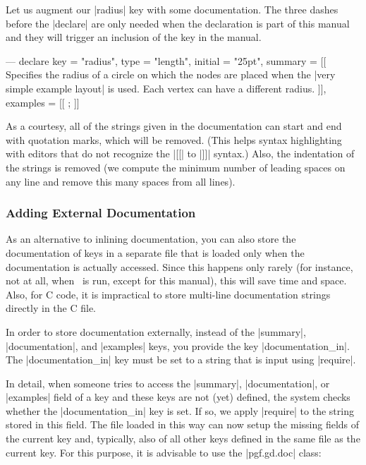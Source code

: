 Let us augment our |radius| key with some documentation. The three
dashes before the |declare| are only needed when the declaration is
part of this manual and they will trigger an inclusion of the key in
the manual.

\begin{codeexample}[code only, tikz syntax=false]
--- 
declare {
  key = "radius",
  type = "length",
  initial = "25pt",
  summary = [[
    Specifies the radius of a circle on which the nodes are placed when
    the |very simple example layout| is used. Each vertex can have a
    different radius.
  ]],
  examples = [[
    \tikz {};
  ]]
}
\end{codeexample}

As a courtesy, all of the strings given in the documentation can start
and end with quotation marks, which will be removed. (This helps
syntax highlighting with editors that do not recognize the |[[| to |]]|
syntax.) Also, the indentation of the strings is removed (we compute
the minimum number of leading spaces on any line and remove this many
spaces from all lines).



\subsubsection{Adding External Documentation}
\label{section-gd-documentation-in}

As an alternative to inlining documentation, you can also store the
documentation of keys in a separate file that is loaded only when the
documentation is actually accessed. Since this happens only rarely
(for instance, not at all, when \tikzname\ is run, except for this
manual), this will save time and space. Also, for C code, it is
impractical to store multi-line documentation strings directly in the C
file.

In order to store documentation externally, instead of the |summary|,
|documentation|, and |examples| keys, you provide the key
|documentation_in|. The |documentation_in| key must be set
to a string that is input using |require|.

In detail, when someone tries to access the |summary|, |documentation|, or
|examples| field of a key and these keys are not (yet) defined, the
system checks whether the |documentation_in| key is set. If so, we
apply |require| to the string stored in this field. The file loaded in
this way can now setup the missing fields of the current key and,
typically, also of all other keys defined in the same file as the
current key. For this purpose, it is advisable to use the |pgf.gd.doc|
class:

